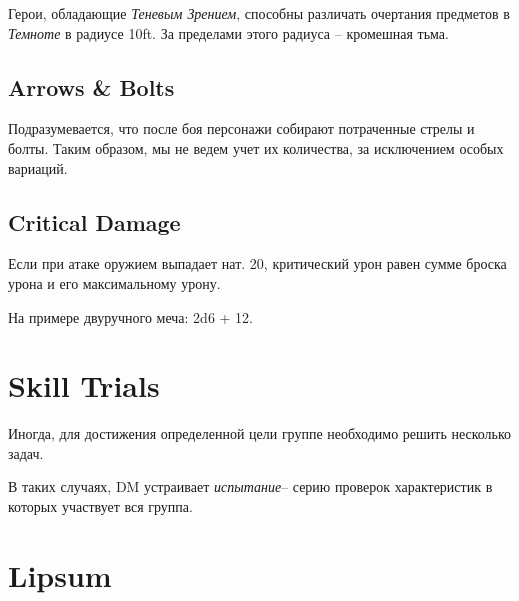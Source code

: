 \documentclass[a4paper,11pt]{book}
\newcommand{\ii}[1]
    {{
      \AlegreyaSansOsF
      \itshape
      #1}}{}
\begin{document}
\begin{multicols}{2}
Герои, обладающие \ii{Теневым Зрением}, способны различать очертания предметов в \ii{Темноте} в радиусе 10ft. За пределами этого радиуса -- кромешная тьма.

\subsection{Arrows \& Bolts}

Подразумевается, что после боя персонажи собирают потраченные стрелы и болты. Таким образом, мы не ведем учет их количества, за исключением особых вариаций.

\subsection{Critical Damage}
Если при атаке оружием выпадает нат. 20, критический урон равен сумме броска урона и его максимальному урону.

На примере двуручного меча: 2d6 + 12.

\section{Skill Trials}

Иногда, для достижения определенной цели группе необходимо решить несколько задач.

В таких случаях, DM устраивает \ii{испытание}-- серию проверок характеристик в которых участвует вся группа.

%
%
%


\section{Lipsum}
\lipsum
\pagebreak


\end{multicols}
\end{document}
